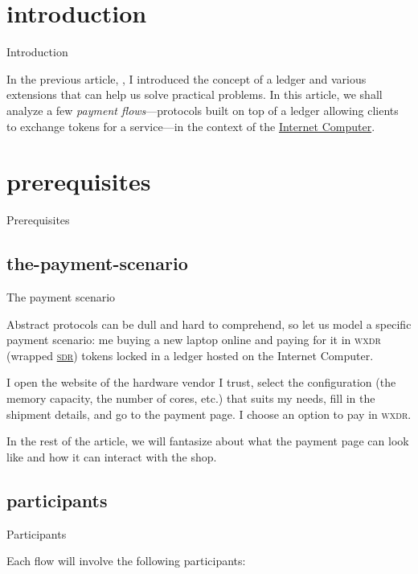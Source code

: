 \documentclass{article}
\subtitle{Payment flows for fungible tokens on the Internet Computer.}
\date{2022-09-21}
\begin{document}
\section{introduction}{Introduction}

In the previous article, , I introduced the concept of a ledger and various extensions that can help us solve practical problems.
In this article, we shall analyze a few \emph{payment flows}---protocols built on top of a ledger allowing clients to exchange tokens for a service---in the context of the \href{https://internetcomputer.org}{Internet Computer}.

\section{prerequisites}{Prerequisites}
\subsection{the-payment-scenario}{The payment scenario}

Abstract protocols can be dull and hard to comprehend, so let us model a specific payment scenario: me buying a new laptop online and paying for it in \textsc{wxdr} (wrapped \href{https://en.wikipedia.org/wiki/Special_drawing_rights}{\textsc{sdr}}) tokens locked in a ledger hosted on the Internet Computer.

I open the website of the hardware vendor I trust, select the configuration (the memory capacity, the number of cores, etc.) that suits my needs, fill in the shipment details, and go to the payment page.
I choose an option to pay in \textsc{wxdr}.

In the rest of the article, we will fantasize about what the payment page can look like and how it can interact with the shop.

\subsection{participants}{Participants}

Each flow will involve the following participants:
\end{document}
